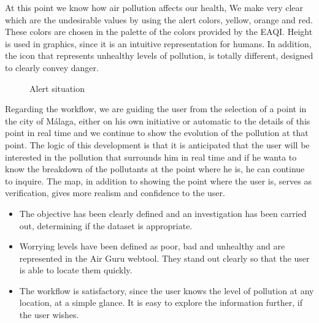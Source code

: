 At this point we know how air pollution affects our health, We make very clear which are the undesirable values by using the alert colors, yellow, orange and 
red. These colors are chosen in the palette of the colors provided by the EAQI.
Height is used in graphics, since it is an intuitive representation for humans. In addition, the icon that represents unhealthy levels of pollution, is
totally different, designed to clearly convey danger. \\

\begin{figure}[ht]
    \centering
    \hfill
    \caption{Alert situation}
\end{figure}

Regarding the workflow, we are guiding the user from the selection of a point in the city of Málaga, either on his own initiative
or automatic to the details of this point in real time and we continue to show  the evolution of the pollution at that point.
The logic of this development is that it is anticipated that the user will be interested in the pollution that surrounds him in real time and if
he wanta to know the breakdown of the pollutants at the point where he is, he can continue to inquire. The map, in addition to showing
the point where the user is, serves as verification, gives more realism and confidence to the user.

\begin{itemize}
    \item The objective has been clearly defined and an investigation has been carried out, determining if the dataset is appropriate.
    \item Worrying levels have been defined as poor, bad and unhealthy and are represented in the Air Guru webtool. They stand out clearly so that the user is able to locate them quickly.
    \item The workflow is satisfactory, since the user knows the level of pollution at any location, at a simple glance. It is easy to explore the information further, if the user wishes.
\end{itemize}